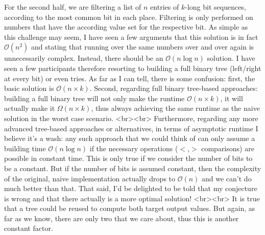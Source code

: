 For the second half, we are filtering a list of $n$ entries of $k$-long bit sequences, according to the most common bit in each place. Filtering is only performed on numbers that have the according value set for the respective bit. As simple as this challenge may seem, I have seen a few arguments that this solution is in fact $\mathcal{O}(n^2)$ and stating that running over the same numbers over and over again is unnecessarily complex. Instead, there should be an $\mathcal{O}(n \log n)$ solution. I have seen a few participants therefore resorting to building a full binary tree (left/right at every bit) or even tries. As far as I can tell, there is some confusion: first, the basic solution is $\mathcal{O}(n \times k)$. Second, regarding full binary tree-based approaches: building a full binary tree will not only make the runtime $\mathcal{O}(n \times k)$, it will actually make it $\mathcal{\Omega}(n \times k)$, thus always achieving the same runtime as the naive solution in the worst case scenario.
<br><br>
Furthermore, regarding any more advanced tree-based approaches or alternatives, in terms of asymptotic runtime I believe it's a wash: any such approach that we could think of can only assume a building time $\mathcal{O}(n \log n)$ if the necessary operations ($<$,$>$ comparisons) are possible in constant time. This is only true if we consider the number of bits to be a constant. But if the number of bits is assumed constant, then the complexity of the original, naive implementation actually drops to  $\mathcal{O}(n)$ and we can't do much better than that. That said, I'd be delighted to be told that my conjecture is wrong and that there actually is a more optimal solution!
<br><br>
It is true that a tree could be reused to compute both target output values. But again, as far as we know, there are only two that we care about, thus this is another constant factor.